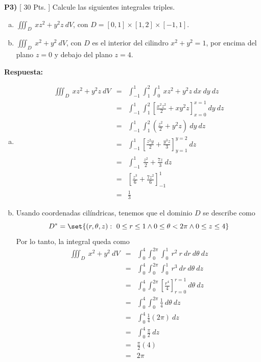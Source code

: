 \documentclass{article}
\begin{document}
\newpage
\noindent\textbf{P3) } \textsf{[ 30 Pts. ] } Calcule las siguientes integrales triples.
  \begin{enumerate}[a)]
    \item $\displaystyle\iiint_D\ xz^2+y^2z\ dV$, con $D=[0,1]\times[1,2]\times[-1,1]$.
    \item $\displaystyle\iiint_D\ x^2+y^2\ dV$, con $D$ es el interior del cilindro $x^2+y^2=1$, por encima del plano $z=0$ y debajo del plano $z=4$.
  \end{enumerate}

\vspace{2mm}
\noindent\textbf{Respuesta:} 
\begin{enumerate}[a)]
  \item 
    \begin{eqnarray*}
      \iiint_D\ xz^2+y^2z\ dV 
        &=& \int_{-1}^1\int_1^2\int_0^1\ xz^2+y^2z\ dx\ dy\ dz\\
        &=& \int_{-1}^1\int_1^2 \left[ \frac{x^2z^2}{2} + xy^2z \right]_{x=0}^{x=1}\ dy\ dz\\
        &=& \int_{-1}^1\int_1^2 \left( \frac{z^2}{2} + y^2z \right)\ dy\ dz\\
        &=& \int_{-1}^1 \left[ \frac{z^2y}{2} + \frac{y^3z}{3} \right]_{y=1}^{y=2}\ dz\\
        &=& \int_{-1}^1\ \frac{z^2}{2}+ \frac{7z}{3}\ dz\\
        &=& \left[ \frac{z^3}{6} + \frac{7z^2}{6} \right]_{-1}^{1}\\
        &=& \frac{1}{3}
    \end{eqnarray*}
  \item Usando coordenadas cilíndricas, tenemos que el dominio $D$ se describe como
    $$D^* = \set{(r,\theta,z) :\ 0\leq r\leq 1 \wedge 0\leq \theta < 2\pi \wedge 0\leq z\leq 4}$$
    Por lo tanto, la integral queda como
    \begin{eqnarray*}
      \iiint_D\ x^2+y^2\ dV 
        &=& \int_0^4\int_0^{2\pi}\int_0^1\ r^2\ r\ dr\ d\theta\ dz\\
        &=& \int_0^4\int_0^{2\pi}\int_0^1\ r^3\ dr\ d\theta\ dz\\
        &=& \int_0^4\int_0^{2\pi}\left[ \frac{r^4}{4} \right]_{r=0}^{r=1}\ d\theta\ dz\\
        &=& \int_0^4\int_0^{2\pi}\frac{1}{4}\ d\theta\ dz\\
        &=& \int_0^4\frac{1}{4}(2\pi)\ dz\\
        &=& \int_0^4\frac{\pi}{2}\ dz\\
        &=& \frac{\pi}{2}(4)\\
        &=& 2\pi
    \end{eqnarray*}
\end{enumerate}
\end{document}
